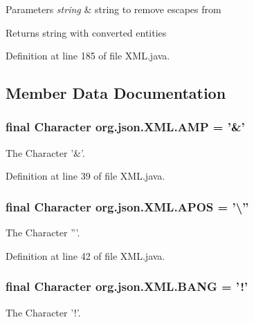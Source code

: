 \begin{DoxyParams}{Parameters}
{\em string} & string to remove escapes from \\
\hline
\end{DoxyParams}
\begin{DoxyReturn}{Returns}
string with converted entities 
\end{DoxyReturn}


Definition at line 185 of file X\-M\-L.\-java.



\subsection{Member Data Documentation}
\hypertarget{classorg_1_1json_1_1XML_a2ed9b74a6dcc1a3833460cb35b72a8e2}{
\subsubsection[{A\-M\-P}]{\setlength{\rightskip}{0pt plus 5cm}final Character org.\-json.\-X\-M\-L.\-A\-M\-P = '\&'\hspace{0.3cm}{\ttfamily [static]}}}\label{classorg_1_1json_1_1XML_a2ed9b74a6dcc1a3833460cb35b72a8e2}
The Character '\&'. 

Definition at line 39 of file X\-M\-L.\-java.

\hypertarget{classorg_1_1json_1_1XML_afc1bccac3be808ee0cc80e6c5261226a}{
\subsubsection[{A\-P\-O\-S}]{\setlength{\rightskip}{0pt plus 5cm}final Character org.\-json.\-X\-M\-L.\-A\-P\-O\-S = '\textbackslash{}''\hspace{0.3cm}{\ttfamily [static]}}}\label{classorg_1_1json_1_1XML_afc1bccac3be808ee0cc80e6c5261226a}
The Character '''. 

Definition at line 42 of file X\-M\-L.\-java.

\hypertarget{classorg_1_1json_1_1XML_a15eadac312b9e5b2d8590be2d92cc24f}{
\subsubsection[{B\-A\-N\-G}]{\setlength{\rightskip}{0pt plus 5cm}final Character org.\-json.\-X\-M\-L.\-B\-A\-N\-G = '!'\hspace{0.3cm}{\ttfamily [static]}}}\label{classorg_1_1json_1_1XML_a15eadac312b9e5b2d8590be2d92cc24f}
The Character '!'. 


